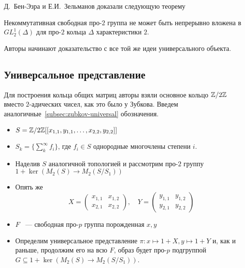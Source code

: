 Д.\ Бен-Эзра и Е.И.\ Зельманов доказали следующую теорему
\begin{theorem}
    \label{thm:ben-ezra-zelmanov-main}
    Некоммутативная свободная про-$2$ группа не может быть непрерывно вложена в $GL^1_2(\Delta)$ для про-$2$ кольца $\Delta$ характеристики $2$.
\end{theorem}
Авторы начинают доказательство с все той же идеи универсального объекта.

\subsection{Универсальное представление}\label{subsec:ben-ezra-zelmanov-universal}
Для построения кольца общих матриц авторы взяли основное кольцо $\mathbb{Z}/2\mathbb{Z}$ вместо $2$-адических чисел, как это было у Зубкова.
Введем аналогичные~\ref{subsec:zubkov-universal} обозначения.

\begin{itemize}
    \item $S = \mathbb{Z}/2\mathbb{Z} [[ x_{1,1}, y_{1,1}, \ldots, x_{2,2}, y_{2,2} ]]$
    \item $S_k = \{\sum\limits_k^{\infty} f_i \}$, где $f_i\in S$ однородные многочлены степени $i$.
    \item Наделив $S$ аналогичной топологией и рассмотрим про-$2$ группу $1 + \ker{(M_2(S) \to M_2(S / S_1))}$
    \item Опять же
    \[
        X=
        \begin{pmatrix}
            x_{1,1} & x_{1,2} \\
            x_{2,1} & x_{2,2}
        \end{pmatrix},
        \quad
        Y=
        \begin{pmatrix}
            y_{1,1} & y_{1,2} \\
            y_{2,1} & y_{2,2}
        \end{pmatrix}
    \]
    \item $F$ ~--- свободная про-$p$ группа порожденная $x,y$
    \item Определим универсальное представление $\pi: x \mapsto 1 + X, y \mapsto 1 + Y$ и, как и раньше, продолжим его на всю $F$, образ будет про-$p$ подгруппой $G\subseteq 1 + \ker{(M_2(S) \to M_2(S / S_1))}$.
\end{itemize}

